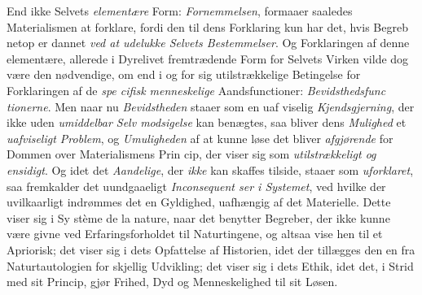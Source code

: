 End ikke Selvets \emph{elementære} Form: \emph{Fornemmelsen},
formaaer saaledes Materialismen at forklare, fordi den til dens
Forklaring kun har det, hvis Begreb netop er dannet \emph{ved at
udelukke Selvets Bestemmelser}. Og Forklaringen af
denne elementære, allerede i Dyrelivet fremtrædende Form for
Selvets Virken vilde dog være den nødvendige, om end i og
for sig utilstrækkelige Betingelse for Forklaringen af de \emph{spe\-%
cifisk menneskelige} Aandsfunctioner: \emph{Bevidsthedsfunc\-%
tionerne}. Men naar nu \emph{Bevidstheden} staaer som en uaf\-%
viselig \emph{Kjendsgjerning}, der ikke uden \emph{umiddelbar Selv\-%
modsigelse} kan benægtes, saa bliver dens \emph{Mulighed} et
\emph{uafviseligt Problem}, og \emph{Umuligheden} af at kunne løse
det bliver \emph{afgjørende} for Dommen over Materialismens Prin\-%
cip, der viser sig som \emph{utilstrækkeligt og ensidigt}. Og
idet det \emph{Aandelige}, der \emph{ikke} kan skaffes tilside, staaer som
\emph{uforklaret}, saa fremkalder det uundgaaeligt \emph{Inconsequent\-%
ser i Systemet}, ved hvilke der uvilkaarligt indrømmes det en
Gyldighed, uafhængig af det Materielle. Dette viser sig i Sy\-%
stème de la nature, naar det benytter Begreber, der ikke kunne
være givne ved Erfaringsforholdet til Naturtingene, og altsaa
vise hen til et Apriorisk; det viser sig i dets Opfattelse af
Historien, idet der tillægges den en fra Naturtautologien for\-%
skjellig Udvikling; det viser sig i dets Ethik, idet det, i Strid
med sit Princip, gjør Frihed, Dyd og Menneskelighed til sit
Løsen.

